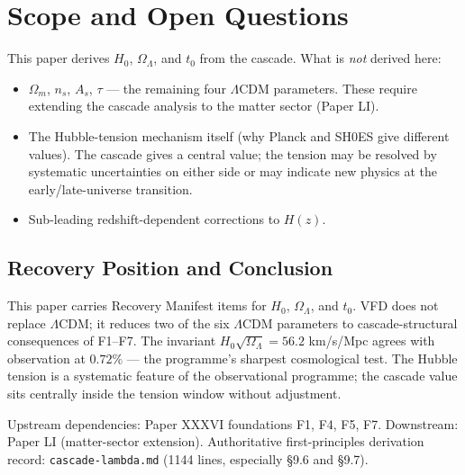 \documentclass[12pt]{article}
\theoremstyle{definition}
\theoremstyle{remark}
\begin{document}
\section{Scope and Open Questions}\label{sec:scope}

This paper derives $H_0$, $\Omega_\Lambda$, and $t_0$ from the cascade. What is \emph{not} derived here:
\begin{itemize}
\item $\Omega_m$, $n_s$, $A_s$, $\tau$ --- the remaining four $\Lambda$CDM parameters. These require extending the cascade analysis to the matter sector (Paper LI).
\item The Hubble-tension mechanism itself (why Planck and SH0ES give different values). The cascade gives a central value; the tension may be resolved by systematic uncertainties on either side or may indicate new physics at the early/late-universe transition.
\item Sub-leading redshift-dependent corrections to $H(z)$.
\end{itemize}

\subsection{Recovery Position and Conclusion}

This paper carries Recovery Manifest items for $H_0$, $\Omega_\Lambda$, and $t_0$. VFD does not replace $\Lambda$CDM; it reduces two of the six $\Lambda$CDM parameters to cascade-structural consequences of F1--F7. The invariant $H_0 \sqrt{\Omega_\Lambda} = 56.2$ km/s/Mpc agrees with observation at $0.72\%$ --- the programme's sharpest cosmological test. The Hubble tension is a systematic feature of the observational programme; the cascade value sits centrally inside the tension window without adjustment.

Upstream dependencies: Paper XXXVI foundations F1, F4, F5, F7. Downstream: Paper LI (matter-sector extension). Authoritative first-principles derivation record: \texttt{cascade-lambda.md} (1144 lines, especially §9.6 and §9.7).
\end{document}
